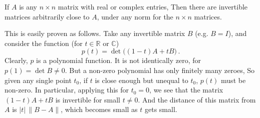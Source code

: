 \documentclass[12pt]{article}
\newcommand{\complex}{\mathbb{C}}
\newcommand{\real}{\mathbb{R}}
\providecommand{\abs}[1]{\lvert#1\rvert}
\providecommand{\norm}[1]{\lVert#1\rVert}
\begin{document}
If $A$ is any $n \times n$ matrix with real or complex entries,
Then there are invertible matrices arbitrarily close to $A$,
under any norm for the $n \times n$ matrices.

This is easily proven as follows. Take any invertible matrix $B$
(e.g. $B = I$), and consider the function
(for $t \in \real$ or $\complex$)
\[
p(t) = \det\bigl((1-t)A + tB \bigr)\,.
\]
Clearly, $p$ is a polynomial function.  It is not identically zero, for $p(1) = \det B  \neq 0$.
But a non-zero polynomial has only finitely many zeroes,
So given any single point $t_0$, if $t$ is close enough but unequal to $t_0$,
$p(t)$ must be non-zero.  In particular, applying this for $t_0 = 0$, 
we see that the matrix $(1-t)A + tB$ is invertible for small $t \neq 0$.
And the distance of this matrix from $A$ is $\abs{t} \, \norm{B-A}$, 
which becomes small as $t$ gets small.
\end{document}
